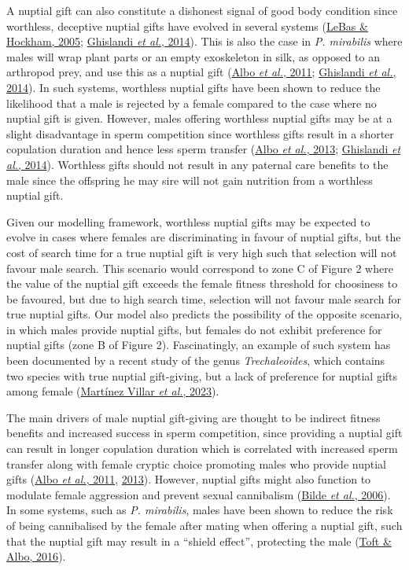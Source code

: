 \documentclass[
]{article}
\begin{document}
A nuptial gift can also constitute a dishonest signal of good body
condition since worthless, deceptive nuptial gifts have evolved in
several systems (\protect\hyperlink{ref-LeBas2005}{LeBas \& Hockham,
2005}; \protect\hyperlink{ref-Ghislandi2014}{Ghislandi \emph{et al.},
2014}). This is also the case in \emph{P. mirabilis} where males will
wrap plant parts or an empty exoskeleton in silk, as opposed to an
arthropod prey, and use this as a nuptial gift
(\protect\hyperlink{ref-Albo2011}{Albo \emph{et al.}, 2011};
\protect\hyperlink{ref-Ghislandi2014}{Ghislandi \emph{et al.}, 2014}).
In such systems, worthless nuptial gifts have been shown to reduce the
likelihood that a male is rejected by a female compared to the case
where no nuptial gift is given. However, males offering worthless
nuptial gifts may be at a slight disadvantage in sperm competition since
worthless gifts result in a shorter copulation duration and hence less
sperm transfer (\protect\hyperlink{ref-Albo2013}{Albo \emph{et al.},
2013}; \protect\hyperlink{ref-Ghislandi2014}{Ghislandi \emph{et al.},
2014}). Worthless gifts should not result in any paternal care benefits
to the male since the offspring he may sire will not gain nutrition from
a worthless nuptial gift.

Given our modelling framework, worthless nuptial gifts may be expected
to evolve in cases where females are discriminating in favour of nuptial
gifts, but the cost of search time for a true nuptial gift is very high
such that selection will not favour male search. This scenario would
correspond to zone C of Figure 2 where the value of the nuptial gift
exceeds the female fitness threshold for choosiness to be favoured, but
due to high search time, selection will not favour male search for true
nuptial gifts. Our model also predicts the possibility of the opposite
scenario, in which males provide nuptial gifts, but females do not
exhibit preference for nuptial gifts (zone B of Figure 2).
Fascinatingly, an example of such system has been documented by a recent
study of the genus \emph{Trechaleoides}, which contains two species with
true nuptial gift-giving, but a lack of preference for nuptial gifts
among female (\protect\hyperlink{ref-Martinez2023}{Martínez Villar
\emph{et al.}, 2023}).

The main drivers of male nuptial gift-giving are thought to be indirect
fitness benefits and increased success in sperm competition, since
providing a nuptial gift can result in longer copulation duration which
is correlated with increased sperm transfer along with female cryptic
choice promoting males who provide nuptial gifts
(\protect\hyperlink{ref-Albo2011}{Albo \emph{et al.}, 2011},
\protect\hyperlink{ref-Albo2013}{2013}). However, nuptial gifts might
also function to modulate female aggression and prevent sexual
cannibalism (\protect\hyperlink{ref-Bilde2006}{Bilde \emph{et al.},
2006}). In some systems, such as \emph{P. mirabilis}, males have been
shown to reduce the risk of being cannibalised by the female after
mating when offering a nuptial gift, such that the nuptial gift may
result in a ``shield effect'', protecting the male
(\protect\hyperlink{ref-Toft2016}{Toft \& Albo, 2016}).
\end{document}
